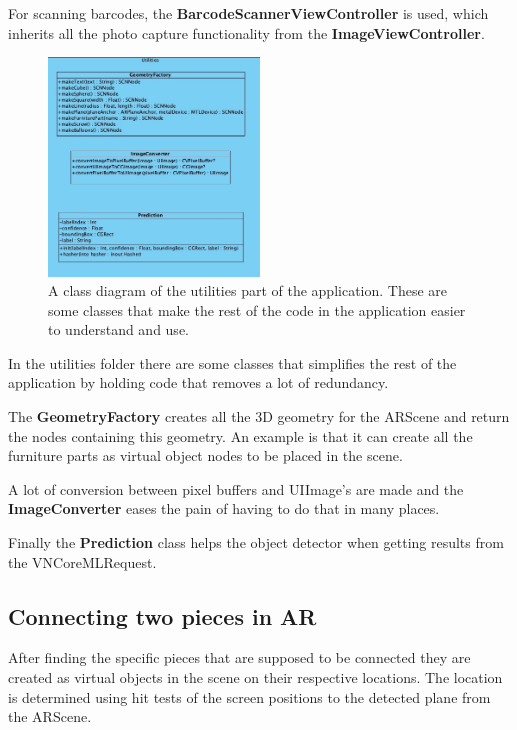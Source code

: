 For scanning barcodes, the \textbf{BarcodeScannerViewController} is used, which inherits all the photo capture functionality from the \textbf{ImageViewController}.\\

\begin{figure}[!hbtp]
\begin{center}
\includegraphics[width = 0.5\textwidth]{./Images/UtilitiesClassDiagram.jpg}
\caption{A class diagram of the utilities part of the application. These are some classes that make the rest of the code in the application easier to understand and use.}
\label{fig:classdiagramutilities}
\end{center}
\end{figure}

In the utilities folder there are some classes that simplifies the rest of the application
by holding code that removes a lot of redundancy.

The \textbf{GeometryFactory} creates all the 3D geometry for the ARScene and return the nodes 
containing this geometry. An example is that it can create all the furniture parts as virtual object 
nodes to be placed in the scene.

A lot of conversion between pixel buffers and UIImage's are made and the \textbf{ImageConverter }
eases the pain of having to do that in many places.

Finally the \textbf{Prediction} class helps the object detector when getting results
from the VNCoreMLRequest.

\subsection{Connecting two pieces in AR}
After finding the specific pieces that are supposed to be connected they are created as
virtual objects in the scene on their respective locations. The location is determined using
hit tests of the screen positions to the detected plane from the ARScene.


